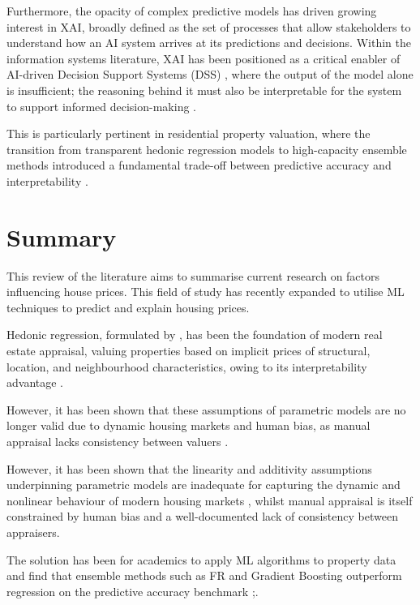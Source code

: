 Furthermore, the opacity of complex predictive models has driven growing interest in XAI, broadly defined as the set of processes that allow stakeholders to understand how an AI system arrives at its predictions and decisions. Within the information systems literature, XAI has been positioned as a critical enabler of AI-driven Decision Support Systems (DSS) \parencite{Giudice2019}, where the output of the model alone is insufficient; the reasoning behind it must also be interpretable for the system to support informed decision-making \parencite{Meske2022}. 

This is particularly pertinent in residential property valuation, where the transition from transparent hedonic regression models to high-capacity ensemble methods introduced a fundamental trade-off between predictive accuracy and interpretability \parencite{Gunes2024}.

\section{Summary}

This review of the literature aims to summarise current research on factors influencing house prices. This field of study has recently expanded to utilise ML techniques to predict and explain housing prices. 

Hedonic regression, formulated by \textcite{Rosen1974}, has been the foundation of modern real estate appraisal, valuing properties based on implicit prices of structural, location, and neighbourhood characteristics, owing to its interpretability advantage \parencite{Wing2003}. 

However, it has been shown that these assumptions of parametric models are no longer valid due to dynamic housing markets \parencite{An2025} and human bias, as manual appraisal lacks consistency between valuers \parencite{Aluko2007}. 

However, it has been shown that the linearity and additivity assumptions underpinning parametric models are inadequate for capturing the dynamic and nonlinear behaviour of modern housing markets \parencite{An2025}, whilst manual appraisal is itself constrained by human bias and a well-documented lack of consistency between appraisers.

The solution has been for academics to apply ML algorithms to property data and find that ensemble methods such as FR and Gradient Boosting outperform regression on the predictive accuracy benchmark \parencite{eh2018};. 

